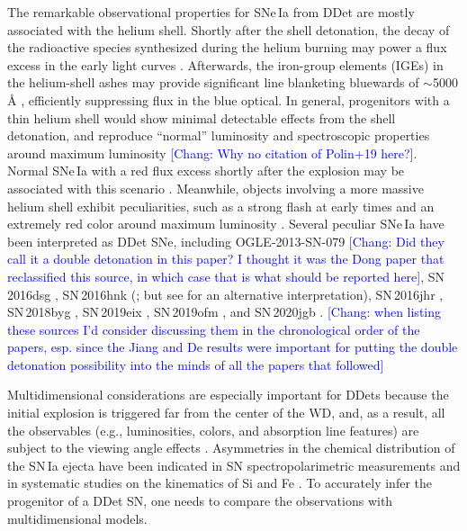 \documentclass[twocolumn]{aastex631}
\newcommand{\chang}[1]{\textcolor{blue}{[Chang: #1]}}
\begin{document}
\begin{CJK*}{UTF8}{gbsn}
The remarkable observational properties for SNe\,Ia from DDet are mostly associated with the helium shell. Shortly after the shell detonation, the decay of the radioactive species synthesized during the helium burning may power a flux excess in the early light curves \citep{Woosley_1994,Fink_DD_2010,Kromer_DD_2010}. Afterwards, the iron-group elements (IGEs) in the helium-shell ashes may provide significant line blanketing bluewards of $\sim$5000\,\r{A} \citep{Kromer_DD_2010}, efficiently suppressing flux in the blue optical. In general, progenitors with a thin helium shell would show minimal detectable effects from the shell detonation, and reproduce ``normal'' luminosity and spectroscopic properties around maximum luminosity \citep[e.g.,][]{Townsley_2019,Magee_2021,Shen_2D_2021} \chang{Why no citation of Polin+19 here?}. Normal SNe\,Ia with a red flux excess shortly after the explosion may be associated with this scenario \citep[e.g., SN\,2018aoz;][]{Ni_2022}. Meanwhile, objects involving a more massive helium shell exhibit peculiarities, such as a strong flash at early times and an extremely red color around maximum luminosity \citep{polin_observational_2019}. Several peculiar SNe\,Ia have been interpreted as DDet SNe, including OGLE-2013-SN-079 \citep{Inserra_OGLE13_079_2015} \chang{Did they call it a double detonation in this paper? I thought it was the Dong paper that reclassified this source, in which case that is what should be reported here}, SN\,2016dsg \citep{Dong_16dsg_2022}, SN\,2016hnk (\citealp{jacobson-galan_16hnk_2020}; but see \citealp{galbany_16hnk_2019} for an alternative interpretation), SN\,2016jhr \citep{jiang_16jhr_2017}, SN\,2018byg \citep{de_18byg_2019}, SN\,2019eix \citep{Gonzalez_19eix_2023}, SN\,2019ofm \citep{de_Ca_rich_2020}, and SN\,2020jgb \citep{Liu_20jgb_2023}. \chang{when listing these sources I'd consider discussing them in the chronological order of the papers, esp. since the Jiang and De results were important for putting the double detonation possibility into the minds of all the papers that followed}

Multidimensional considerations are especially important for DDets because the initial explosion is triggered far from the center of the WD, and, as a result, all the observables (e.g., luminosities, colors, and absorption line features) are subject to the viewing angle effects \citep{Fink_DD_2010,Shen_2D_2021}. Asymmetries in the chemical distribution of the SN\,Ia ejecta have been indicated in SN spectropolarimetric measurements \citep{} and in systematic studies on the kinematics of Si and Fe \citep{Maeda_2010,Maguire_2018,Li_2021}. To accurately infer the progenitor of a DDet SN, one needs to compare the observations with multidimensional models.


\end{CJK*}
\end{document}
